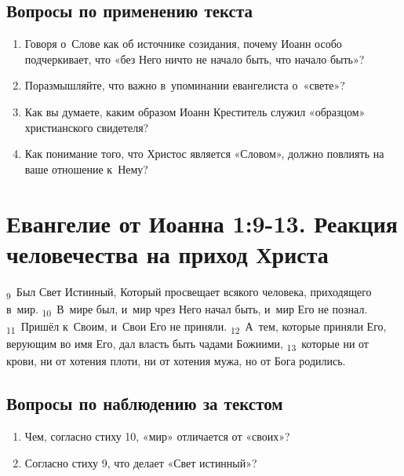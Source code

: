 \documentclass[a4paper,12pt]{article}
\begin{document}
\subsection*{Вопросы по применению текста}

\begin{enumerate}
    \item Говоря о~Слове как об источнике созидания, почему Иоанн особо подчеркивает, что «без Него ничто не начало быть, что начало быть»?
    
    \myline
    
    \myline

    \item Поразмышляйте, что важно в~упоминании евангелиста о~«свете»? 
    
    \myline
    
    \myline
    
    \item Как вы думаете, каким образом Иоанн Креститель служил «образцом» христианского свидетеля? 
    
    \myline
    
    \myline
    
    \item Как понимание того, что Христос является «Словом», должно повлиять на ваше отношение к~Нему?
    
    \myline
    
    \myline

\end{enumerate}



\section{Евангелие от Иоанна 1:9-13. Реакция человечества на приход Христа}

\textsubscript{9}~Был Свет Истинный, Который просвещает всякого человека, приходящего в~мир. \textsubscript{10}~В~мире был, и~мир чрез Него начал быть, и~мир Его не познал. \textsubscript{11}~Пришёл к~Своим, и~Свои Его не приняли. \textsubscript{12}~А~тем, которые приняли Его, верующим во имя Его, дал власть быть чадами Божиими, \textsubscript{13}~которые ни от крови, ни от хотения плоти, ни от хотения мужа, но от Бога родились.

\subsection*{Вопросы по наблюдению за текстом}
\begin{enumerate}
    \item Чем, согласно стиху 10, «мир» отличается от «своих»? 
    
    \myline
    
    \myline

    \item Согласно стиху 9, что делает «Свет истинный»?

    \myline
    
    \myline   
\end{enumerate}
\end{document}
